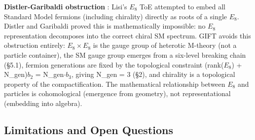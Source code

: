 \documentclass[11pt,a4paper]{article}
\begin{document}
\textbf{Distler-Garibaldi obstruction} \cite{36}: Lisi's \(E_{8}\) ToE
attempted to embed all Standard Model fermions (including chirality)
directly as roots of a single \(E_{8}\). Distler and Garibaldi proved
this is mathematically impossible: no \(E_{8}\) representation
decomposes into the correct chiral SM spectrum. GIFT avoids this
obstruction entirely: \(E_{8} \times E_{8}\) is the gauge group of
heterotic M-theory (not a particle container), the SM gauge group
emerges from a six-level breaking chain (§5.1), fermion generations are
fixed by the topological constraint (rank(\(E_{8}\)) + N\_gen)\(b_{2}\)
= N\_gen\(\cdot b_{3}\), giving N\_gen = 3 (§2), and chirality is a
topological property of the compactification. The mathematical
relationship between \(E_{8}\) and particles is cohomological (emergence
from geometry), not representational (embedding into algebra).

\subsection{Limitations and Open Questions}
\end{document}
